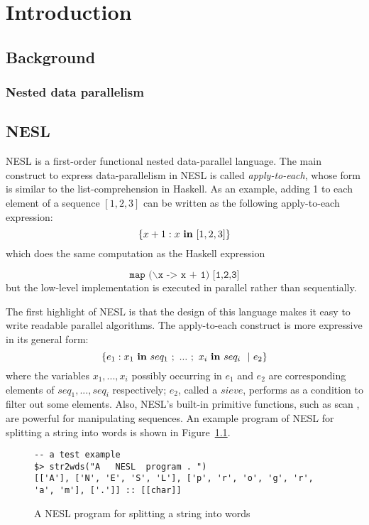 
\chapter{Introduction}

\section{Background}
\subsection{Nested data parallelism}

\section{NESL}
NESL \cite{blel95nesl} is a first-order functional nested data-parallel language. The main construct to express data-parallelism in NESL is called \emph{apply-to-each}, whose form is similar to the list-comprehension in Haskell. 
As an example, adding 1 to each element of a sequence $[1,2,3]$ can be written as the following apply-to-each expression:
$$ \{x+1 : x \ \mathbf{in} \ [1,2,3] \}$$
which does the same computation as the Haskell expression 

$$\texttt{map ($\backslash$x -> x + 1) [1,2,3]}$$ 
but the low-level implementation is executed in parallel rather than sequentially. 

The first highlight of NESL is that the design of this language makes it easy to write readable parallel algorithms. The apply-to-each construct is more expressive in its general form:
$$ \{ e_1 :  x_1 \ \*{in} \ seq_1 \ ; \ ... \ ; \ x_i \  \*{in} \ seq_i \ \ | \ e_2  \}$$
where the variables $x_1, ...,x_i$ possibly occurring in $e_1$ and $e_2$ are corresponding elements of $seq_1,...,seq_i$ respectively; $e_2$, called a $sieve$, performs as a condition to filter out some elements. 
Also, NESL's built-in primitive functions, such as scan \cite{blel89scan}, are powerful for manipulating sequences.
An example program of NESL for splitting a string into words is shown in Figure~\ref{fig-nesl-wordpart}.

\begin{figure}
 
\begin{lstlisting}[style=nesl-style]
-- a test example
$> str2wds("A   NESL  program . ")
[['A'], ['N', 'E', 'S', 'L'], ['p', 'r', 'o', 'g', 'r', 'a', 'm'], ['.']] :: [[char]]
\end{lstlisting}
\caption{{A NESL program for splitting a string into words \label{fig-nesl-wordpart}}}
\end{figure}

